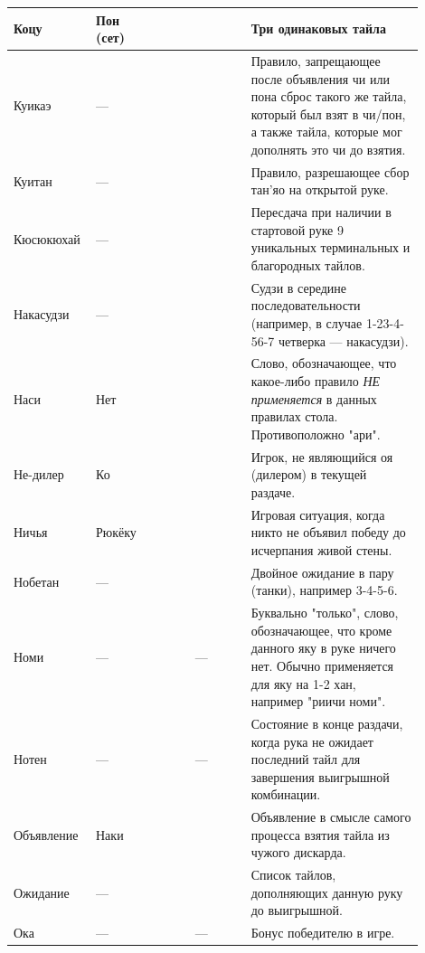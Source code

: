 \begin{tabularx}{\linewidth}{L{0.14\linewidth}L{0.13\linewidth}L{0.1\linewidth}L{0.13\linewidth}L{0.4\linewidth}}
	\midrule
	Коцу & Пон (сет) &  &  & Три одинаковых тайла \\
	\midrule
	Куикаэ & --- &  &  & Правило, запрещающее после объявления чи или пона сброс такого же тайла, который был взят в чи/пон, а также тайла, которые мог дополнять это чи до взятия. \\
	\midrule
	Куитан & --- &  &  & Правило, разрешающее сбор тан'яо на открытой руке. \\
	\midrule
	Кюсюкюхай & --- &  &   & Пересдача при наличии в стартовой руке 9 уникальных терминальных и благородных тайлов. \\
	\midrule
	Накасудзи & --- &  &  & Судзи в середине последовательности (например, в случае 1-23-4-56-7 четверка --- накасудзи). \\
	\midrule
	Наси & Нет &  &  & Слово, обозначающее, что какое-либо правило \textit{НЕ применяется} в данных правилах стола. Противоположно "ари". \\
	\midrule
	Не-дилер & Ко &  &  & Игрок, не являющийся оя (дилером) в текущей раздаче. \\
	\midrule
	Ничья & Рюкёку &  &  & Игровая ситуация, когда никто не объявил победу до исчерпания живой стены. \\
	\midrule
	Нобетан & --- &  &  & Двойное ожидание в пару (танки), например 3-4-5-6. \\
	\midrule
	Номи & --- &  & --- & Буквально "только", слово, обозначающее, что кроме данного яку в руке ничего нет. Обычно применяется для яку на 1-2 хан, например "риичи номи". \\
	\midrule
	Нотен & --- &  & --- & Состояние в конце раздачи, когда рука не ожидает последний тайл для завершения выигрышной комбинации. \\
	\midrule
	Объявление & Наки &  &  & Объявление в смысле самого процесса взятия тайла из чужого дискарда. \\
	\midrule
	Ожидание & --- &  &  & Список тайлов, дополняющих данную руку до выигрышной. \\
	\midrule
	Ока & --- &  & --- & Бонус победителю в игре. \\

\end{tabularx}
